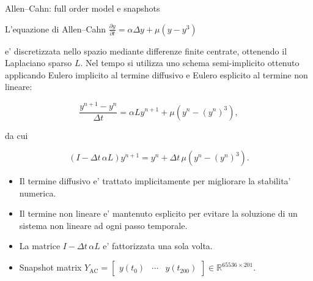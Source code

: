 \documentclass[10pt,aspectratio=169,handout]{beamer}
\begin{document}
\begin{frame}{Allen--Cahn: full order model e snapshots}

L'equazione di Allen--Cahn
$\frac{\partial y}{\partial t}
=
\alpha \Delta y
+
\mu (y-y^3)
$

e' discretizzata nello spazio mediante differenze finite centrate,
ottenendo il Laplaciano sparso $L$.
Nel tempo si utilizza uno schema semi-implicito ottenuto applicando
Eulero implicito al termine diffusivo e Eulero esplicito al termine non lineare:

\[
\frac{y^{n+1}-y^n}{\Delta t}
=
\alpha L y^{n+1}
+
\mu \left(y^n-(y^n)^3\right),
\]

da cui

\[
(I-\Delta t\,\alpha L)y^{n+1}
=
y^n+\Delta t\,\mu\left(y^n-(y^n)^3\right).
\]

\begin{itemize}
  \item Il termine diffusivo e' trattato implicitamente per migliorare la stabilita' numerica.
  \item Il termine non lineare e' mantenuto esplicito per evitare la soluzione di un sistema non lineare ad ogni passo temporale.
  \item La matrice $I-\Delta t\,\alpha L$ e' fattorizzata una sola volta.
  \item Snapshot matrix $
Y_{\mathrm{AC}}
=
\begin{bmatrix}
y(t_0)&\cdots&y(t_{200})
\end{bmatrix}
\in\mathbb{R}^{65536\times201}.
$
\end{itemize}

\end{frame}
\end{document}
